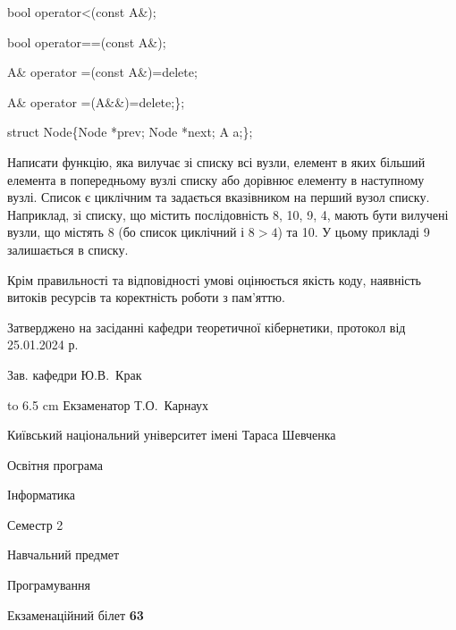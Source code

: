 \documentclass[12pt, ukrainian]{article}
\begin{document}
{\quad  bool operator<(const A\&); 

\quad  bool operator==(const A\&); 

\quad A\& operator =(const A\&)=delete; 

\quad  A\& operator =(A\&\&)=delete;\};

struct Node\{Node *prev; Node *next; A a;\};

Написати функцію, яка вилучає зі списку всі вузли, елемент в яких більший елемента в попередньому вузлі списку або дорівнює елементу в наступному вузлі. Список є циклічним та задається вказівником на перший вузол списку. Наприклад, зі списку, що містить послідовність 8, 10, 9, 4, мають бути вилучені вузли, що містять 8 (бо список циклічний і $8>4$) та 10. У цьому прикладі 9 залишається в списку.

Крім правильності та відповідності умові оцінюється якість коду, наявність витоків ресурсів та коректність роботи з пам'яттю. 

}
{\smallskip\smallskip \begin {scriptsize} Затверджено на засіданні кафедри теоретичної кібернетики, протокол   від   25.01.2024 р.\par\smallskip\smallskip\smallskip\smallskip
{\parbox {6.5 cm} {Зав. кафедри \dotfill Ю.В.~Крак}}\hspace {0.7cm} {\hbox to 6.5 cm { Екзаменатор \dotfill Т.О.~Карнаух}} \end{scriptsize}}
\newpage
{{\begin {scriptsize}\par
{ \center  Київський національний університет імені Тараса Шевченка \par}
{\parbox {5 cm}{Освітня програма \hfill}{\parbox {7 cm}{Інформатика\hfill}}\parbox {6 cm}{\hfill Семестр 2}}\par
{\parbox {5 cm} {Навчальний предмет \hfill}\parbox {7 cm}{Програмування \hfill}\parbox {6cm}{\hfill}\par}\vspace{-15pt} \end{scriptsize}}{\center Екзаменаційний білет \No \textbf { 63 }\par}}
\end{document}
